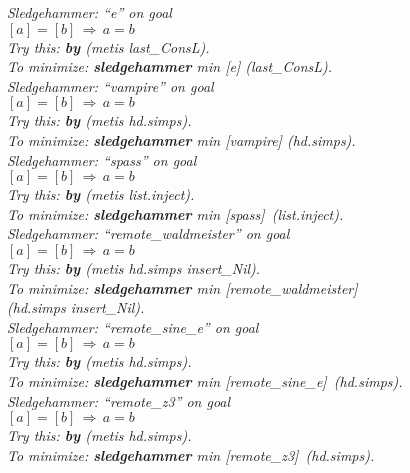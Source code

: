 \documentclass[a4paper,12pt]{article}
\begin{document}
\prew
\slshape
Sledgehammer: ``\textit{e}'' on goal \\
$[a] = [b] \,\Longrightarrow\, a = b$ \\
Try this: \textbf{by} (\textit{metis last\_ConsL}). \\
To minimize: \textbf{sledgehammer} \textit{min} [\textit{e}] (\textit{last\_ConsL}). \\[3\smallskipamount]
%
Sledgehammer: ``\textit{vampire}'' on goal \\
$[a] = [b] \,\Longrightarrow\, a = b$ \\
Try this: \textbf{by} (\textit{metis hd.simps}). \\
To minimize: \textbf{sledgehammer} \textit{min} [\textit{vampire}] (\textit{hd.simps}). \\[3\smallskipamount]
%
Sledgehammer: ``\textit{spass}'' on goal \\
$[a] = [b] \,\Longrightarrow\, a = b$ \\
Try this: \textbf{by} (\textit{metis list.inject}). \\
To minimize: \textbf{sledgehammer} \textit{min} [\textit{spass}]~(\textit{list.inject}). \\[3\smallskipamount]
%
Sledgehammer: ``\textit{remote\_waldmeister}'' on goal \\
$[a] = [b] \,\Longrightarrow\, a = b$ \\
Try this: \textbf{by} (\textit{metis hd.simps insert\_Nil}). \\
To minimize: \textbf{sledgehammer} \textit{min} [\textit{remote\_waldmeister}] \\
(\textit{hd.simps insert\_Nil}). \\[3\smallskipamount]
%
Sledgehammer: ``\textit{remote\_sine\_e}'' on goal \\
$[a] = [b] \,\Longrightarrow\, a = b$ \\
Try this: \textbf{by} (\textit{metis hd.simps}). \\
To minimize: \textbf{sledgehammer} \textit{min} [\textit{remote\_sine\_e}]~(\textit{hd.simps}). \\[3\smallskipamount]
%
Sledgehammer: ``\textit{remote\_z3}'' on goal \\
$[a] = [b] \,\Longrightarrow\, a = b$ \\
Try this: \textbf{by} (\textit{metis hd.simps}). \\
To minimize: \textbf{sledgehammer} \textit{min} [\textit{remote\_z3}]~(\textit{hd.simps}).
\postw
\end{document}
